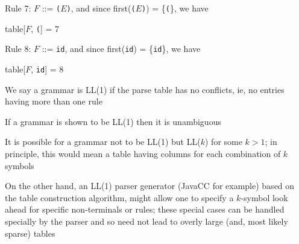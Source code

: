 \documentclass[8pt,a4paper,compress,handout]{beamer}
\newcommand{\mm}[1]{$#1$}
\newenvironment{spaced}
{
\smallskip
\hspace{.5cm}
\begin{minipage}[c]{\textwidth}
}
{
\end{minipage}
\smallskip
}
\begin{document}
\begin{frame}[fragile]
\pause

Rule 7: $F$  ::= \lstinline{(}$E$\lstinline{)}, and since first(\lstinline{(}$E$\lstinline{)}) = \{\lstinline{(}\}, we have

\text{ }
\begin{spaced}
\begin{production}
table[\mm{F}, \lstinline{(}] = 7
\end{production}
\end{spaced}

\pause

Rule 8: $F$  ::= \lstinline{id}, and since first(\lstinline{id}) = \{\lstinline{id}\}, we have

\text{ }
\begin{spaced}
\begin{production}
table[\mm{F}, \lstinline{id}] = 8
\end{production}
\end{spaced}

\pause

We say a grammar is LL(1) if the parse table has no conflicts, ie, no entries having more than one rule

\pause
\bigskip

If a grammar is shown to be LL(1) then it is unambiguous

\pause
\bigskip

It is possible for a grammar not to be LL(1) but LL($k$) for some $k > 1$; in principle, this would mean a table having columns for each combination of $k$ symbols

\pause
\bigskip

On the other hand, an LL(1) parser generator (JavaCC for example) based on the table construction algorithm, might allow one to specify a $k$-symbol look ahead for specific non-terminals or rules; these special cases can be handled specially by the parser and so need not lead to overly large (and, most likely sparse) tables
\end{frame}
\end{document}
